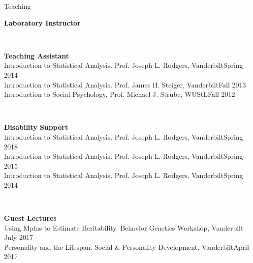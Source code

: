 \begin{rSection}{\textrm{Teaching}}
\begin{minipage}{\linewidth}{\large {\bf Laboratory Instructor}\\}
\end{minipage}
\medskip\\
\begin{minipage}{\linewidth}{\large {\bf Teaching Assistant}}\\
Introduction to Statistical Analysis. Prof. Joseph L. Rodgers, Vanderbilt\hfill  {Spring 2014}\smallskip\\
Introduction to Statistical Analysis. Prof. James H. Steiger, Vanderbilt\hfill  {Fall 2013}\smallskip\\
Introduction to Social Psychology. Prof. Michael J. Strube, WUStL\hfill{Fall 2012}\end{minipage}\medskip\\
\begin{minipage}{\linewidth}{\large {\bf Disability Support}}\\
Introduction to Statistical Analysis. Prof. Joseph L. Rodgers, Vanderbilt\hfill  {Spring 2018}\smallskip\\
Introduction to Statistical Analysis. Prof. Joseph L. Rodgers, Vanderbilt\hfill  {Spring 2015}\smallskip\\
Introduction to Statistical Analysis. Prof. Joseph L. Rodgers, Vanderbilt\hfill{Spring 2014}\end{minipage}\medskip\\
\begin{minipage}{\linewidth}{\large {\bf Guest Lectures}}\\
Using Mplus to Estimate Heritability. Behavior Genetics Workshop, Vanderbilt \hfill{July 2017}\\
Personality and the Lifespan. Social \& Personality Development, Vanderbilt\hfill {April 2017}\end{minipage}
\end{rSection}

